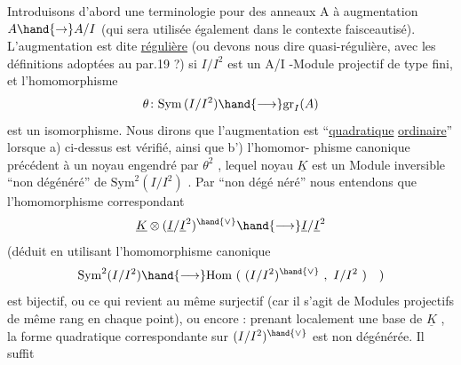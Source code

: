 Introduisons d'abord une terminologie pour des anneaux A à
augmentation $A \hand{\to} A/I$ (qui sera utilisée également dans le contexte
faisceautisé). L'augmentation est dite \uline{régulière} (ou devons nous dire
quasi-régulière, avec les définitions adoptées au par.19 ?) si  $I/I^2$ est
un A/I -Module projectif de type fini, et  l'homomorphisme
\[ \theta\colon \mathrm{Sym}\,(I/I^2) \hand{\longrightarrow} \mathrm{gr}_I(A) \]
est un isomorphisme. Nous dirons que l'augmentation est  ``\uline{quadratique}
\uline{ordinaire}'' lorsque a) ci-dessus est vérifié, ainsi que b') l'homomor-%
phisme canonique précédent à un noyau engendré par $\theta^2$ , lequel noyau $\underline{K}$
est un Module inversible ``non dégénéré'' de $\mathrm{Sym}^2(I/I^2)$ . Par ``non dégé%
néré'' nous entendons que l'homomorphisme correspondant
\[ \underline{K} \otimes (\underline{I}/\underline{I}^2)^{\hand{\vee}} \hand{\longrightarrow} \underline{I}/\underline{I}^2 \]
(déduit en utilisant l'homomorphisme canonique
\[ \mathrm{Sym}^2(I/I^2) \hand{\longrightarrow} \mathrm{Hom}\ (\ (I/I^2)^{\hand{\vee}}\ ,\ I/I^2\ )\quad ) \]
est bijectif, ou ce qui revient au même surjectif (car il s'agit de
Modules projectifs  de même rang en chaque point), ou encore : prenant
localement une base  de $\underline{K}$ ,  la forme
quadratique correspondante sur $(I/I^2)^{\hand{\vee}}$ est non dégénérée. Il suffit

